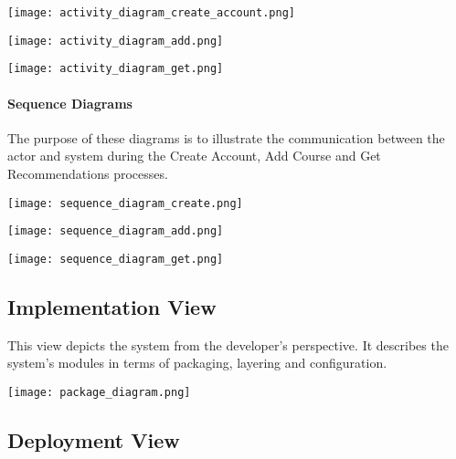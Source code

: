 \documentclass[10pt]{article}
\begin{document}
\begin{center}
\texttt{[image: activity\_diagram\_create\_account.png]}
\end{center}


\newpage

\begin{center}
\texttt{[image: activity\_diagram\_add.png]}
\end{center}


\begin{center}
\texttt{[image: activity\_diagram\_get.png]}
\end{center}


\paragraph{Sequence Diagrams \\}

The purpose of these diagrams is to illustrate the communication between the actor and system during the Create Account, Add Course and Get Recommendations processes.

\begin{center}
\texttt{[image: sequence\_diagram\_create.png]}
\end{center}




\begin{center}
\texttt{[image: sequence\_diagram\_add.png]}
\end{center}


\begin{center}
\texttt{[image: sequence\_diagram\_get.png]}
\end{center}


\subsection{Implementation View}

This view depicts the system from the developer’s perspective. It describes the system’s modules in terms of packaging, layering and configuration.

\begin{center}
\texttt{[image: package\_diagram.png]}
\end{center}


\subsection{Deployment View}
\end{document}
